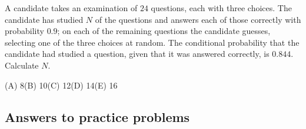 \begin{practice}
A candidate takes an examination of $24$ questions, each with three choices.
The candidate has studied $N$ of the questions and answers each of those
correctly with probability $0.9$; on each of the remaining questions the
candidate guesses, selecting one of the three choices at random. The
conditional probability that the candidate had studied a question, given that
it was answered correctly, is $0.844$. Calculate $N$.

\medskip
(A) 8\qquad (B) 10\qquad (C) 12\qquad (D) 14\qquad (E) 16
\end{practice}

\subsection{Answers to practice problems}

